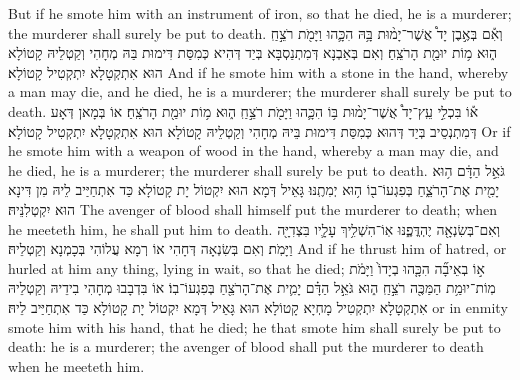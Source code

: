 {But if he smote him with an instrument of iron, so that he died, he is a murderer; the murderer shall surely be put to death.}{}
{וְאִ֡ם בְּאֶ֣בֶן יָד֩ אֲשֶׁר־יָמ֨וּת בָּ֥הּ הִכָּ֛הוּ וַיָּמֹ֖ת רֹצֵ֣חַֽ ה֑וּא מ֥וֹת יוּמַ֖ת הָרֹצֵֽחַ׃
}
{וְאִם בְּאַבְנָא דְּמִתְנַסְבָּא בְּיַד דְּהִיא כְּמִסַּת דִּימוּת בַּהּ מְחָהִי וְקַטְלֵיהּ קָטוֹלָא הוּא אִתְקְטָלָא יִתְקְטִיל קָטוֹלָא׃}
{And if he smote him with a stone in the hand, whereby a man may die, and he died, he is a murderer; the murderer shall surely be put to death.}{}
{א֡וֹ בִּכְלִ֣י עֵֽץ־יָד֩ אֲשֶׁר־יָמ֨וּת בּ֥וֹ הִכָּ֛הוּ וַיָּמֹ֖ת רֹצֵ֣חַֽ ה֑וּא מ֥וֹת יוּמַ֖ת הָרֹצֵֽחַ׃
}
{אוֹ בְּמָאן דְּאָע דְּמִתְנְסֵיב בְּיַד דְּהוּא כְּמִסַּת דִּימוּת בֵּיהּ מְחָהִי וְקַטְלֵיהּ קָטוֹלָא הוּא אִתְקְטָלָא יִתְקְטִיל קָטוֹלָא׃}
{Or if he smote him with a weapon of wood in the hand, whereby a man may die, and he died, he is a murderer; the murderer shall surely be put to death.}{}
{גֹּאֵ֣ל הַדָּ֔ם ה֥וּא יָמִ֖ית אֶת־הָרֹצֵ֑חַ בְּפִגְעוֹ־ב֖וֹ ה֥וּא יְמִתֶֽנּוּ׃
}
{גָּאֵיל דְּמָא הוּא יִקְטוֹל יָת קָטוֹלָא כַּד אִתְחַיַּיב לֵיהּ מִן דִּינָא הוּא יִקְטְלִנֵּיהּ׃}
{The avenger of blood shall himself put the murderer to death; when he meeteth him, he shall put him to death.}{}
{וְאִם־בְּשִׂנְאָ֖ה יֶהְדֳּפֶ֑נּוּ אֽוֹ־הִשְׁלִ֥יךְ עָלָ֛יו בִּצְדִיָּ֖ה וַיָּמֹֽת׃
}
{וְאִם בְּשִׂנְאָה דְּחָהִי אוֹ רְמָא עֲלוֹהִי בְּכָמְנָא וְקַטְלֵיהּ׃}
{And if he thrust him of hatred, or hurled at him any thing, lying in wait, so that he died;}{}
{א֣וֹ בְאֵיבָ֞ה הִכָּ֤הוּ בְיָדוֹ֙ וַיָּמֹ֔ת מֽוֹת־יוּמַ֥ת הַמַּכֶּ֖ה רֹצֵ֣חַֽ ה֑וּא גֹּאֵ֣ל הַדָּ֗ם יָמִ֛ית אֶת־הָרֹצֵ֖חַ בְּפִגְעוֹ־בֽוֹ׃}
{אוֹ בִּדְבָבוּ מְחָהִי בִידֵיהּ וְקַטְלֵיהּ אִתְקְטָלָא יִתְקְטִיל מָחְיָא קָטוֹלָא הוּא גָּאֵיל דְּמָא יִקְטוֹל יָת קָטוֹלָא כַּד אִתְחַיַּיב לֵיהּ׃}
{or in enmity smote him with his hand, that he died; he that smote him shall surely be put to death: he is a murderer; the avenger of blood shall put the murderer to death when he meeteth him.}{}
